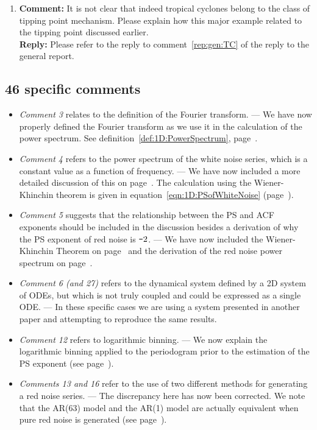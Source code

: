 \begin{enumerate}
	\item {\bf Comment:} It is not clear that indeed tropical cyclones belong to the class of tipping point mechanism. Please explain how this major example related to the tipping point discussed earlier.\\
	{\bf Reply:} Please refer to the reply to comment~\ref{rep:gen:TC} of the reply to the general report. 
	
\end{enumerate}

\subsection*{46 specific comments}

\begin{itemize}
	\item \emph{Comment 3} relates to the definition of the Fourier transform. — We have now properly defined the Fourier transform as we use it in the calculation of the power spectrum. See definition~\ref{def:1D:PowerSpectrum}, page~\pageref{def:1D:PowerSpectrum}.
	\item \emph{Comment 4} refers to the power spectrum of the white noise series, which is a constant value as a function of frequency. — We have now included a more detailed discussion of this on page~\pageref{def:1D:whitenoise}. The calculation using the Wiener-Khinchin theorem is given in equation~\ref{eqn:1D:PSofWhiteNoise} (page~\pageref{eqn:1D:PSofWhiteNoise}).
	\item \emph{Comment 5} suggests that the relationship between the PS and ACF exponents should be included in the discussion besides a derivation of why the PS exponent of red noise is $\textup{\texttt{-}}2$. — We have now included the Wiener-Khinchin Theorem on page~\pageref{thm:1D:wiener-khinchin} and the derivation of the red noise power spectrum on page~\pageref{eqn:1D:rednoise_scalingfactor}.
	\item \emph{Comment 6 (and 27)} refers to the dynamical system defined by a 2D system of ODEs, but which is not truly coupled and could be expressed as a single ODE. — In these specific cases we are using a system presented in another paper and attempting to reproduce the same results.
	\item \emph{Comment 12} refers to logarithmic binning. — We now explain the logarithmic binning applied to the periodogram prior to the estimation of the PS exponent (see page~\pageref{pageref:1D:logbinning}).
	\item \emph{Comments 13 and 16} refer to the use of two different methods for generating a red noise series. — The discrepancy here has now been corrected. We note that the AR(63) model and the AR(1) model are actually equivalent when pure red noise is generated (see page~\pageref{eqn:1D:ColouredNoise_kasdin}).

\end{itemize}

